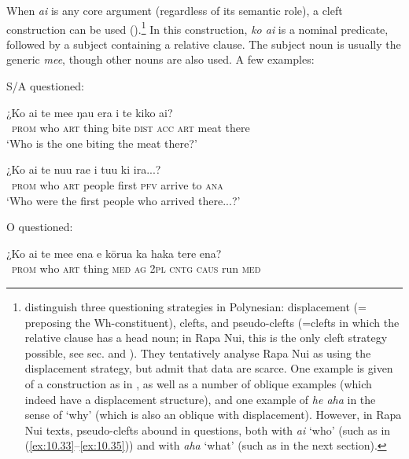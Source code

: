 When \textit{ai} is any core argument (regardless of its semantic role), a cleft construction can be used ().\footnote{\label{fn:487}\citet{PotsdamPolinsky2011} distinguish three questioning strategies in Polynesian: displacement (= preposing the Wh-constituent), clefts, and pseudo-clefts (=clefts in which the relative clause has a head noun; in Rapa Nui, this is the only cleft strategy possible, see sec.  and ). They tentatively analyse Rapa Nui as using the displacement strategy, but admit that data are scarce. One example is given of a construction as in , as well as a number of oblique examples (which indeed have a displacement structure), and one example of \textit{he aha} in the sense of ‘why’ (which is also an oblique with displacement). However, in Rapa Nui texts, pseudo-clefts abound in questions, both with \textit{ai} ‘who’ (such as in (\ref{ex:10.33}–\ref{ex:10.35})) and with \textit{aha} ‘what’ (such as  in the next section).} In this construction, \textit{ko ai} is a nominal predicate, followed by a subject containing a relative clause. The subject noun is usually the generic \textit{me{\ꞌ}e}, though other nouns are also used. A few examples:

S/A questioned:

\ea\label{ex:10.33}
\gll ¿Ko ai te me{\ꞌ}e ŋau era i te kiko {\ꞌ}ai? \\
~\textsc{prom} who \textsc{art} thing bite \textsc{dist} \textsc{acc} \textsc{art} meat there \\

\glt 
‘Who is the one biting the meat there?’ \textstyleExampleref{[R416.1310]}
\z

\ea\label{ex:10.34}
\gll ¿Ko ai te nu{\ꞌ}u ra{\ꞌ}e i tu{\ꞌ}u ki ira...? \\
~\textsc{prom} who \textsc{art} people first \textsc{pfv} arrive to \textsc{ana} \\

\glt
‘Who were the first people who arrived there...?’ \textstyleExampleref{[R616.390]} 
\z

O questioned:

\ea\label{ex:10.35}
\gll ¿Ko ai te me{\ꞌ}e ena e kōrua ka haka tere ena?\\
~\textsc{prom} who \textsc{art} thing \textsc{med} \textsc{ag} \textsc{2pl} \textsc{cntg} \textsc{caus} run \textsc{med}\\

